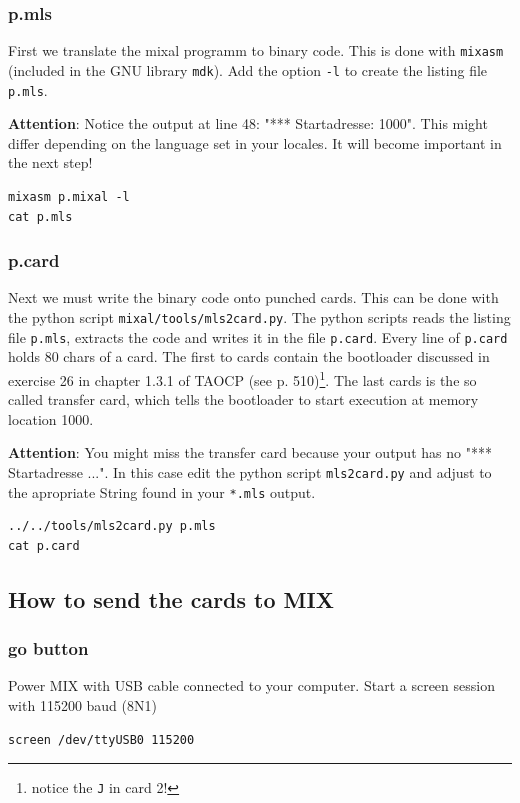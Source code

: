 \documentclass[a4paper,ngerman]{scrartcl}
\begin{document}
\subsubsection{p.mls}
First we translate the mixal programm to binary code. This is done with \lstinline|mixasm| (included in the GNU library \lstinline|mdk|). Add the option \lstinline|-l| to create the listing file \lstinline|p.mls|.

\textbf{Attention}: Notice the output at line 48: "*** Startadresse: 1000". This might differ depending on the language set in your locales. It will become important in the next step!

\begin{lstlisting}[numbers=none,frame=none]
mixasm p.mixal -l
cat p.mls
\end{lstlisting}


\subsubsection{p.card}
Next we must write the binary code onto punched cards. This can be done with the python script \lstinline|mixal/tools/mls2card.py|.
The python scripts reads the listing file \lstinline|p.mls|, extracts the code and writes it in the file \lstinline|p.card|.
Every line of \lstinline|p.card| holds 80 chars of a card. The first to cards contain the bootloader discussed in exercise 26 in chapter 1.3.1 of TAOCP (see p. 510)\footnote{notice the \lstinline|J| in card 2!}. The last cards is the so called transfer card, which tells the bootloader to start execution at memory location 1000.

\textbf{Attention}: You might miss the transfer card because your output has no "*** Startadresse ...".
In this case edit the python script \lstinline|mls2card.py| and adjust to the apropriate String found in your \lstinline|*.mls| output.


\begin{lstlisting}[numbers=none,frame=none]
../../tools/mls2card.py p.mls
cat p.card
\end{lstlisting}




\subsection{How to send the cards to MIX}
\subsubsection{go button}
Power MIX with USB cable connected to your computer.
Start a screen session with 115200 baud (8N1)
\begin{lstlisting}[numbers=none,frame=none]
screen /dev/ttyUSB0 115200
\end{lstlisting}
\end{document}
